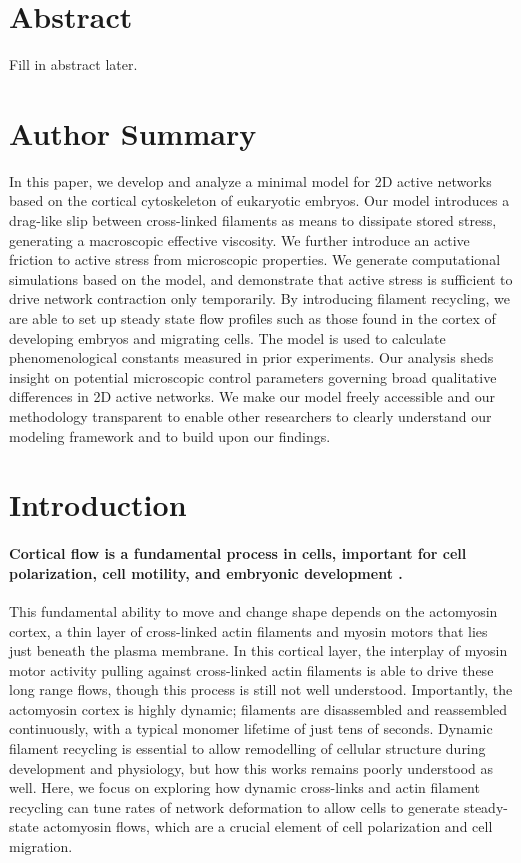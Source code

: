 \documentclass[10pt,letterpaper]{article}
\begin{document}
\section*{Abstract}
Fill in abstract later.


\section*{Author Summary}
In this paper, we develop and analyze a minimal model for 2D active networks based on the cortical cytoskeleton of eukaryotic embryos.  Our model introduces a drag-like slip between cross-linked filaments as means to dissipate stored stress, generating a macroscopic effective viscosity.  We further introduce an active friction to active stress from microscopic properties.  We generate computational simulations based on the model, and demonstrate that active stress is sufficient to drive network contraction only temporarily.  By introducing filament recycling, we are able to set up steady state flow profiles such as those found in the cortex of developing embryos and migrating cells.  The model is used to calculate phenomenological constants measured in prior experiments.  Our analysis sheds insight on potential microscopic control parameters governing broad qualitative differences in 2D active networks.  We make our model freely accessible and our methodology transparent to enable other researchers to clearly understand our modeling framework and to build upon our findings.

\linenumbers

\section*{Introduction}

\paragraph{Cortical flow is a fundamental process in cells, important for cell polarization, cell motility, and embryonic development \cite{cellmech_flows3,cellmech_flows2}.}  This fundamental ability to move and change shape depends on the actomyosin cortex, a thin layer of cross-linked actin filaments and myosin motors that lies just beneath the plasma membrane.  In this cortical layer, the interplay of myosin motor activity pulling against cross-linked actin filaments is able to drive these long range flows\cite{Munro2004413}, though this process is still not well understood.  Importantly, the actomyosin cortex is highly dynamic; filaments are disassembled and reassembled continuously, with a typical monomer lifetime of just tens of seconds. Dynamic filament recycling is essential to allow remodelling of cellular structure during development and physiology, but how this works remains poorly understood as well. Here, we focus on exploring how dynamic cross-links and actin filament recycling can tune rates of network deformation to allow cells to generate steady-state actomyosin flows, which are a crucial element of cell polarization and cell migration.
\end{document}
